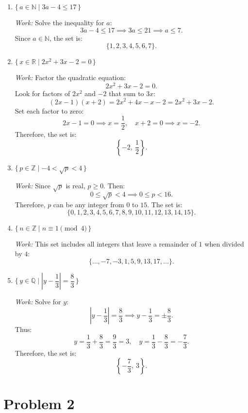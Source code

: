 \documentclass[12pt]{article}
\theoremstyle{definition}
\begin{document}
\begin{enumerate}[label=(\alph*)]
    \item $\{\, a \in \mathbb{N} \mid 3a - 4 \leq 17 \,\}$

    \textit{Work:} Solve the inequality for $a$:
    \[
    3a - 4 \leq 17 \implies 3a \leq 21 \implies a \leq 7.
    \]
    Since $a \in \mathbb{N}$, the set is:
    \[
    \{1, 2, 3, 4, 5, 6, 7\}.
    \]

    \item $\{\, x \in \mathbb{R} \mid 2x^2 + 3x - 2 = 0 \,\}$

    \textit{Work:} Factor the quadratic equation:
    \[
    2x^2 + 3x - 2 = 0.
    \]
    Look for factors of $2x^2$ and $-2$ that sum to $3x$:
    \[
    (2x - 1)(x + 2) = 2x^2 + 4x - x -2 = 2x^2 + 3x -2.
    \]
    Set each factor to zero:
    \[
    2x - 1 = 0 \implies x = \dfrac{1}{2}, \quad x + 2 = 0 \implies x = -2.
    \]
    Therefore, the set is:
    \[
    \left\{ -2,\ \dfrac{1}{2} \right\}.
    \]

    \item $\{\, p \in \mathbb{Z} \mid -4 < \sqrt{p} < 4 \,\}$

    \textit{Work:} Since $\sqrt{p}$ is real, $p \geq 0$. Then:
    \[
    0 \leq \sqrt{p} < 4 \implies 0 \leq p < 16.
    \]
    Therefore, $p$ can be any integer from $0$ to $15$. The set is:
    \[
    \{0, 1, 2, 3, 4, 5, 6, 7, 8, 9, 10, 11, 12, 13, 14, 15\}.
    \]

    \item $\{\, n \in \mathbb{Z} \mid n \equiv 1 \pmod{4} \,\}$

    \textit{Work:} This set includes all integers that leave a remainder of $1$ when divided by $4$:
    \[
    \{\ldots, -7, -3, 1, 5, 9, 13, 17, \ldots\}.
    \]

    \item $\{\, y \in \mathbb{Q} \mid \left| y - \dfrac{1}{3} \right| = \dfrac{8}{3} \,\}$

    \textit{Work:} Solve for $y$:
    \[
    \left| y - \dfrac{1}{3} \right| = \dfrac{8}{3} \implies y - \dfrac{1}{3} = \pm \dfrac{8}{3}.
    \]
    Thus:
    \[
    y = \dfrac{1}{3} + \dfrac{8}{3} = \dfrac{9}{3} = 3, \quad y = \dfrac{1}{3} - \dfrac{8}{3} = -\dfrac{7}{3}.
    \]
    Therefore, the set is:
    \[
    \left\{ -\dfrac{7}{3},\ 3 \right\}.
    \]

\end{enumerate}

\newpage

\section*{Problem 2}
\end{document}

